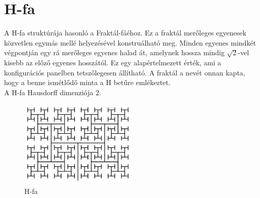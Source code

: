 \section{H-fa}
A H-fa struktúrája hasonló a Fraktál-fáéhoz. Ez a fraktál merőleges egyenesek közvetlen egymás mellé helyezésével konstruálható meg. Minden egyenes mindkét végpontján egy rá merőleges egyenes halad át, amelynek hossza mindig $\sqrt{2}$-vel kisebb az előző egyenes hosszától. Ez egy alapértelmezett érték, ami a konfigurációs panelben tetszőlegesen állítható. A fraktál a nevét onnan kapta, hogy a benne ismétlődő minta a H betűre emlékeztet.\\ 
A H-fa Hausdorff dimenziója $2$.
\begin{figure}[!ht]
	\begin{center}
		\includegraphics[width=0.5\textwidth]{img/HTree}
		\caption[labelInTOC]{H-fa}
	\end{center}
\end{figure}
